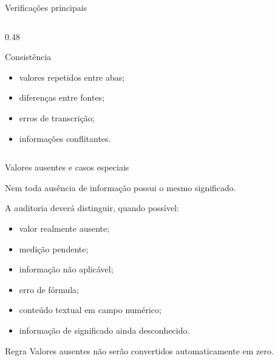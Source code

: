 \begin{frame}{Verificações principais}
\begin{columns}[T]
\begin{column}{0.48\textwidth}
            \begin{block}{Consistência}
                \begin{itemize}
                    \item valores repetidos entre abas;
                    \item diferenças entre fontes;
                    \item erros de transcrição;
                    \item informações conflitantes.
                \end{itemize}
            \end{block}

        \end{column}

    \end{columns}

\end{frame}



\begin{frame}{Valores ausentes e casos especiais}

    Nem toda ausência de informação possui o mesmo significado.

    \vspace{0.3cm}

    A auditoria deverá distinguir, quando possível:

    \begin{itemize}
        \item valor realmente ausente;
        \item medição pendente;
        \item informação não aplicável;
        \item erro de fórmula;
        \item conteúdo textual em campo numérico;
        \item informação de significado ainda desconhecido.
    \end{itemize}

    \vspace{0.3cm}

    \begin{alertblock}{Regra}
        Valores ausentes não serão convertidos automaticamente em zero.
    \end{alertblock}

\end{frame}


